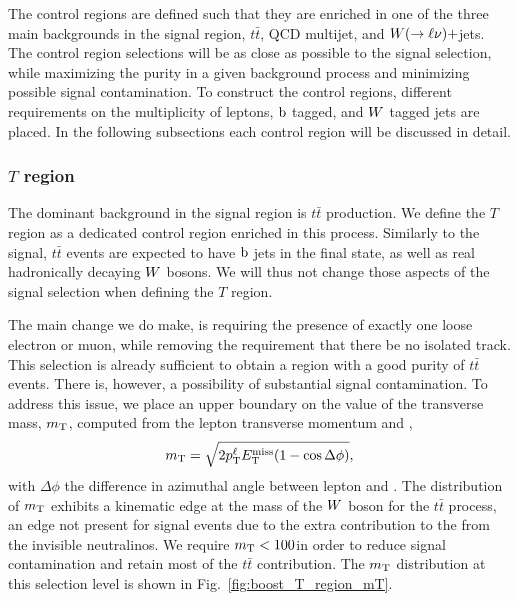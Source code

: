 
The control regions are defined such that they are enriched in one of the three main backgrounds in
the signal region, $t\bar{t}$, QCD multijet, and $W(\rightarrow \ell \nu)+$jets. The control region
selections will be as close as possible to the signal selection, while maximizing the purity in a
given background process and minimizing possible signal contamination. 
To construct the control regions, different requirements on the 
multiplicity of leptons, $\mathrm{b}$ tagged, and $W$ tagged jets are placed. 
In the following subsections each control region will be discussed in detail. 

\subsubsection{\texorpdfstring{$T$}{T} region \label{sec:boost_T_region}}

The dominant background in the signal region is $t\bar{t}$ production. We define the $T$ region as a
dedicated control region enriched in this process. 
Similarly to the signal, $t\bar{t}$ events are expected to have $\mathrm{b}$ jets in the final state, as
well as real hadronically decaying $W$ bosons. We will thus not change those aspects of the signal
selection when defining the $T$ region. 

The main change we do make, is requiring the presence of exactly one loose electron or muon, while
removing the requirement that there be no isolated track. This selection is already sufficient to
obtain a region with a good purity of $t\bar{t}$ events. There is, however, a possibility of
substantial signal contamination. To address this issue, we place an upper boundary on the value of
the transverse mass, $m_{\mathrm{T}}$, computed from the lepton transverse momentum and \VEtmiss, 
\begin{equation}
 m_{\mathrm{T}} = \sqrt{2p_{\mathrm{T}}^\ell E_{\mathrm{T}}^{\text{miss}} ( 1 - \cos\Delta\phi )},
\end{equation}
with $\Delta\phi$ the difference in azimuthal angle between lepton and \VEtmiss. 
The distribution of $m_{\mathrm{T}}$ exhibits a kinematic edge at the mass of the $W$ boson for the $t\bar{t}$
process, an edge not present for signal events due to the extra contribution to the \ETm from the
invisible neutralinos.  We require $m_{\mathrm{T}} < 100$\GeV in order to reduce signal contamination and
retain most of the $t\bar{t}$ contribution. The $m_{\mathrm{T}}$ distribution at this selection level is shown
in Fig.~\ref{fig:boost_T_region_mT}. 


